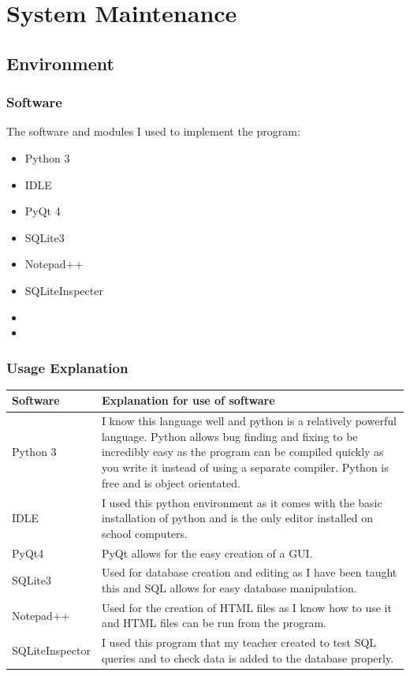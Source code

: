 \chapter{System Maintenance}

\section{Environment}

\subsection{Software}
The software and modules I used to implement the program:
\begin{itemize}
	\item Python 3
	\item IDLE
	\item PyQt 4
	\item SQLite3
	\item Notepad++
	\item SQLiteInspecter
	\item 
	\item 
\end{itemize}

\subsection{Usage Explanation}
\begin{center}
	\begin{tabular}{|p{3cm}|p{6cm}|}
		\hline
		\textbf{Software}   & \textbf{Explanation for use of software} \\ \hline
		Python 3 & I know this language well and python is a relatively powerful language. Python allows bug finding and fixing to be incredibly easy as the program can be compiled quickly as you write it instead of using a separate compiler. Python is free and is object orientated. \\ \hline
		IDLE &  I used this python environment as it comes with the basic installation of python and is the only editor installed on school computers. \\ \hline
		PyQt4 & PyQt allows for the easy creation of a GUI. \\ \hline
		SQLite3 & Used for database creation and editing as I have been taught this and SQL allows for easy database manipulation. \\ \hline
		Notepad++ & Used for the creation of HTML files as I know how to use it and HTML files can be run from the program. \\ \hline
		SQLiteInspector & I used this program that my teacher created to test SQL queries and to check data is added to the database properly. \\ \hline
	\end{tabular}
\end{center}


